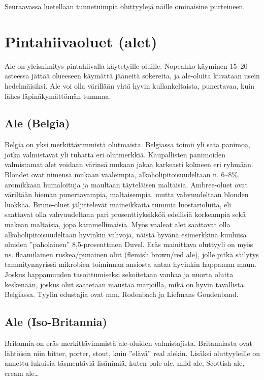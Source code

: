 \documentclass[a4paper,11pt]{report}
\begin{document}
Seuraavassa luetellaan tunnetuimpia oluttyylejä näille ominaisine piirteineen.

\section{Pintahiivaoluet (alet)}

Ale on yleisnimitys pintahiivalla käytetyille oluille. Nopeahko käyminen 15--20 asteessa jättää olueeseen käymättä jääneitä sokereita, ja ale-oluita kuvataan usein hedelmäisiksi. Ale voi olla värillään yhtä hyvin kullankeltaista, punertavaa, kuin lähes läpinäkymättömän tummaa.

\subsection*{Ale (Belgia)}

Belgia on yksi merkittävimmistä olutmaista. Belgiassa toimii yli sata panimoa, jotka valmistavat yli tuhatta eri olutmerkkiä. Kaupallisten panimoiden valmistamat alet voidaan värinsä mukaan jakaa karkeasti kolmeen eri ryhmään. Blondet ovat nimensä mukaan vaaleimpia, alkoholipitoisuudeltaan n. 6--8\%, aromikkaan humaloituja ja maultaan täyteläisen maltaisia. Ambree-oluet ovat väriltään hieman punertavampia, maltaisempia, mutta vahvuudeltaan blonden luokkaa. Brune-oluet jäljittelevät maineikkaita tummia luostarioluita, eli saattavat olla vahvuudeltaan pari prosenttiyksikköä edellisiä korkeampia sekä makean maltaisia, jopa karamellimaisia. Myös vaaleat alet saattavat olla alkoholipitoisuudeltaan hyvinkin vahvoja, näistä hyvänä esimerkkinä kuuluisa oluiden ''paholainen'' 8,5-prosenttinen Duvel. Eräs mainittava oluttyyli on myös ns. flaamilainen ruskea/punainen olut (flemish brown/red ale), jolle pitkä säilytys tammitynnyrissä mikrobien toiminnan ansiosta antaa hyvinkin happaman maun. Joskus happamuuden tasoittumiseksi sekoitetaan vanhaa ja nuorta olutta keskenään, joskus olut saatetaan maustaa marjoilla, mikä on hyvin tavallista Belgiassa. Tyylin edustajia ovat mm. Rodenbach ja Liefmans Goudenband.

\subsection*{Ale (Iso-Britannia)}

Britannia on eräs merkittävimmistä ale-oluiden valmistajista. Britanniasta ovat lähtöisin niin bitter, porter, stout, kuin ''elävä'' real alekin. Lisäksi oluttyyleille on annettu lukuisia täsmentäviä lisänimiä, kuten pale ale, mild ale, Scottish ale, cream ale\ldots
\end{document}
